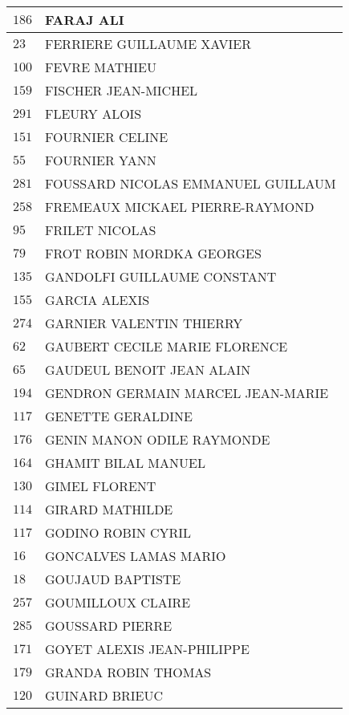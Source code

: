 \begin{xltabular}{\linewidth}{|l|X|}
    \hline
    $186$ & FARAJ ALI \\
    \hline
    $23$ & FERRIERE GUILLAUME XAVIER \\
    \hline
    $100$ & FEVRE MATHIEU \\
    \hline
    $159$ & FISCHER JEAN-MICHEL \\
    \hline
    $291$ & FLEURY ALOIS \\
    \hline
    $151$ & FOURNIER CELINE \\
    \hline
    $55$ & FOURNIER YANN \\
    \hline
    $281$ & FOUSSARD NICOLAS EMMANUEL GUILLAUM \\
    \hline
    $258$ & FREMEAUX MICKAEL PIERRE-RAYMOND \\
    \hline
    $95$ & FRILET NICOLAS \\
    \hline
    $79$ & FROT ROBIN MORDKA GEORGES \\
    \hline
    $135$ & GANDOLFI GUILLAUME CONSTANT \\
    \hline
    $155$ & GARCIA ALEXIS \\
    \hline
    $274$ & GARNIER VALENTIN THIERRY \\
    \hline
    $62$ & GAUBERT CECILE MARIE FLORENCE \\
    \hline
    $65$ & GAUDEUL BENOIT JEAN ALAIN \\
    \hline
    $194$ & GENDRON GERMAIN MARCEL JEAN-MARIE \\
    \hline
    $117$ & GENETTE GERALDINE \\
    \hline
    $176$ & GENIN MANON ODILE RAYMONDE \\
    \hline
    $164$ & GHAMIT BILAL MANUEL \\
    \hline
    $130$ & GIMEL FLORENT \\
    \hline
    $114$ & GIRARD MATHILDE \\
    \hline
    $117$ & GODINO ROBIN CYRIL \\
    \hline
    $16$ & GONCALVES LAMAS MARIO \\
    \hline
    $18$ & GOUJAUD BAPTISTE \\
    \hline
    $257$ & GOUMILLOUX CLAIRE \\
    \hline
    $285$ & GOUSSARD PIERRE \\
    \hline
    $171$ & GOYET ALEXIS JEAN-PHILIPPE \\
    \hline
    $179$ & GRANDA ROBIN THOMAS \\
    \hline
    $120$ & GUINARD BRIEUC \\
    \hline

\end{xltabular}
